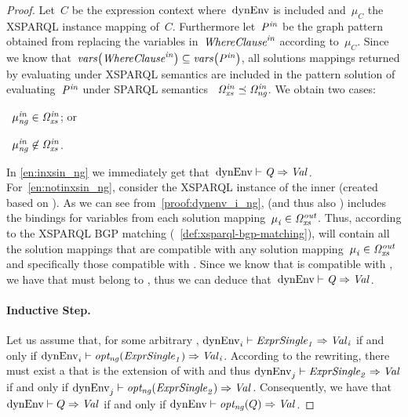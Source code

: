 \begin{proof}
  Let~$C$ be the expression context where~${\textrm{dynEnv}}$ is included and~$\mu_C$ the XSPARQL instance mapping of~$C$.
  Furthermore let~${\mathit{P}}_{\mathit{}}^{\mathit{in}}$ be the graph pattern obtained from replacing the variables
  in~${\mathit{{\textit{Whe\-re\-Clause}}}}_{\mathit{}}^{\mathit{in}}$ according to~$\mu_C$.
  Since we know that~$\mathit{vars}\!\left({\mathit{{\textit{Whe\-re\-Clause}}}}_{\mathit{}}^{\mathit{in}}\right) \subseteq \mathit{vars}\!\left({\mathit{P}}_{\mathit{}}^{\mathit{in}}\right)$, all solutions mappings
  returned by evaluating \SparqlWhereClause{} under XSPARQL semantics are included in the pattern
  solution of evaluating~${\mathit{P}}_{\mathit{}}^{\mathit{in}}$ under SPARQL semantics \ie~${\mathit{\Omega}}_{\mathit{xs}}^{\mathit{in}} \preceq {\mathit{\Omega}}_{\mathit{ng}}^{\mathit{in}}$.
  We obtain two cases:
  \begin{inparaenum}[(i)]
  \item\label{en:inxsin_ng}~${\mathit{\mu}}_{\mathit{ng}}^{\mathit{in}} \in {\mathit{\Omega}}_{\mathit{xs}}^{\mathit{in}}$; or
  \item\label{en:notinxsin_ng}~${\mathit{\mu}}_{\mathit{ng}}^{\mathit{in}} \not\in {\mathit{\Omega}}_{\mathit{xs}}^{\mathit{in}}$. 
  \end{inparaenum}
  In \eqref{en:inxsin_ng} we immediately get that~${\textrm{dynEnv}} \vdash \mathit{{Q}_{}} \Rightarrow \mathit{{Val}_{}}$.
  For~\eqref{en:notinxsin_ng}, consider  the XSPARQL instance of the inner \SparqlForClause (created based
  on ). As we can see from~\eqref{proof:dynenv_i_ng},  (and thus also ) includes the
  bindings for variables from each solution mapping~${\mathit{\mu}}_{\mathit{i}}^{\mathit{}} \in {\mathit{\Omega}}_{\mathit{xs}}^{\mathit{out}}$.  Thus, according to the XSPARQL \ac{BGP}
  matching (\cf~\cref{def:xsparql-bgp-matching}),  will contain all the solution mappings that are
  compatible with any solution mapping~${\mathit{\mu}}_{\mathit{i}}^{\mathit{}} \in {\mathit{\Omega}}_{\mathit{xs}}^{\mathit{out}}$ and specifically those compatible with .
  Since we know that  is compatible with , we have that  must belong to ,
  thus we can deduce that~${\textrm{dynEnv}} \vdash \mathit{{Q}_{}} \Rightarrow \mathit{{Val}_{}}$. 
  \paragraph*{Inductive Step.}
  Let us assume that, for some arbitrary , $\mathrm{dynEnv}_{i}^{\mathit{}} \vdash \mathit{{{\textit{Expr\-Single}}}_{1}} \Rightarrow
  \mathit{{Val}_{i}}$ if and only if $\mathrm{dynEnv}_{i}^{\mathit{}} \vdash \mathit{opt_{ng}}\!\left(\mathit{{{\textit{Expr\-Single}}}_{1}}\right) \Rightarrow
  \mathit{{Val}_{i}}$.
  According to the  rewriting, there must exist a  that is the extension of 
  with  and thus
  $\mathrm{dynEnv}_{j}^{\mathit{}} \vdash \mathit{{{\textit{Expr\-Single}}}_{2}} \Rightarrow \mathit{{Val}_{}}$ if and only if $\mathrm{dynEnv}_{j}^{\mathit{}} \vdash \mathit{opt_{ng}}\!\left(\mathit{{{\textit{Expr\-Single}}}_{2}}\right) \Rightarrow \mathit{{Val}_{}}$.  Consequently, we have that ${\textrm{dynEnv}} \vdash Q
  \Rightarrow \mathit{{Val}_{}}$ if and only if ${\textrm{dynEnv}} \vdash \mathit{opt_{ng}}\!\left(Q\right) \Rightarrow \mathit{{Val}_{}}$.
\end{proof}



